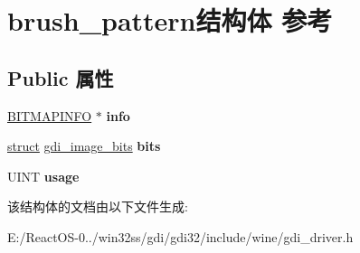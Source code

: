 \hypertarget{structbrush__pattern}{}\section{brush\+\_\+pattern结构体 参考}
\label{structbrush__pattern}
\subsection*{Public 属性}
\begin{DoxyCompactItemize}
\item 
\mbox{\label{structbrush__pattern_aa96a284d4c3adf897830a954c1a83ce6}} 
\hyperlink{structtag_b_i_t_m_a_p_i_n_f_o}{B\+I\+T\+M\+A\+P\+I\+N\+FO} $\ast$ {\bfseries info}
\item 
\mbox{\label{structbrush__pattern_a1044387381e75cf20be581b4d5a32f7a}} 
\hyperlink{interfacestruct}{struct} \hyperlink{structgdi__image__bits}{gdi\+\_\+image\+\_\+bits} {\bfseries bits}
\item 
\mbox{\label{structbrush__pattern_a94f34c2baf9326286d3afad37c96c313}} 
U\+I\+NT {\bfseries usage}
\end{DoxyCompactItemize}


该结构体的文档由以下文件生成\+:\begin{DoxyCompactItemize}
\item 
E\+:/\+React\+O\+S-\/0../win32ss/gdi/gdi32/include/wine/gdi\+\_\+driver.\+h\end{DoxyCompactItemize}
